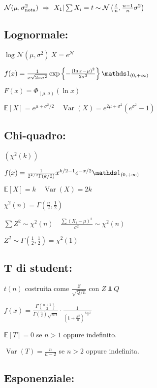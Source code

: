 $\Nc(\mu,\sigma^2_{\text{nota}})\ \Rightarrow\ X_1|\sum X_i=t\sim\Nc\left(\frac{t}{n},\frac{n-1}{n}\sigma^2\right)$

\subsection{Lognormale:} 

$\log \mathcal{N}\left(\mu, \sigma^{2}\right)\  X=e^{\mathcal{N}}$

$f(x)=\frac{1}{x \sqrt{2 \pi \sigma^{2}}} \exp \left\{-\frac{(\ln x-\mu)^{2}}{2 \sigma^{2}}\right\} \Ind_{(0,+\infty)}$

$F(x)=\Phi_{(\mu, \sigma)}(\ln x)$

$\mathbb{E}[X]=e^{\mu+\sigma^{2} / 2} \quad \operatorname{Var}(X)=e^{2 \mu+\sigma^{2}}\left(e^{\sigma^{2}}-1\right)$

\subsection{Chi-quadro:} 

$\left(\chi^{2}(k)\right)$

$f(x)=\frac{1}{2^{k / 2} \Gamma(k / 2)} x^{k / 2-1} e^{-x / 2} \Ind_{(0,+\infty)}$

$\mathbb{E}[X]=k \quad \operatorname{Var}(X)=2 k$

$\chi^{2}(n)=\Gamma\left(\frac{n}{2}, \frac{1}{2}\right)$

$\sum Z^2\sim\chi^2(n) \quad \frac{\sum(X_i-\mu)^2}{\sigma^2}\sim\chi^2(n)$

$Z^{2} \sim \Gamma\left(\frac{1}{2}, \frac{1}{2}\right)=\chi^{2}(1)$

\subsection{T di student:}

$t(n)$ costruita come $\frac{Z}{\sqrt{Q/n}}$ con $Z \Perp Q$

$f(x)=\frac{\Gamma\left(\frac{n+1}{2}\right)}{\Gamma\left(\frac{n}{2}\right) \sqrt{\pi n}} \cdot \frac{1}{\left(1+\frac{x^{2}}{n}\right)^{\frac{n+1}{2}}}$

$\mathbb{E}[T]=0$ se $n>1$ oppure indefinito.

$\operatorname{Var}(T)=\frac{n}{n-2}$ se $n>2$ oppure indefinita.

\subsection{Esponenziale:} 


